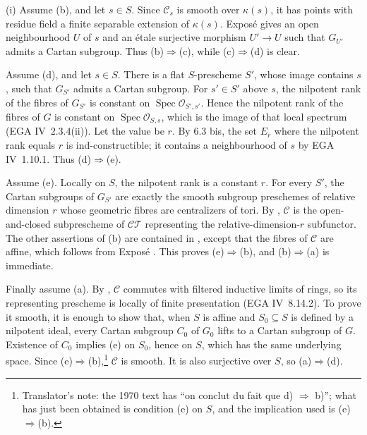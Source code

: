 (i) Assume (b), and let \(s\in S\). Since \(\mathcal C_s\) is smooth
over \(\kappa(s)\), it has points with residue field a finite
separable extension of \(\kappa(s)\). Exposé  gives an open
neighbourhood \(U\) of \(s\) and an étale surjective morphism
\(U'\to U\) such that \(G_{U'}\) admits a Cartan subgroup. Thus
(b)\(\Rightarrow\)(c), while (c)\(\Rightarrow\)(d) is clear.

Assume (d), and let \(s\in S\). There is a flat \(S\)-prescheme
\(S'\), whose image contains \(s\), such that \(G_{S'}\) admits a
Cartan subgroup. For \(s'\in S'\) above \(s\), the nilpotent rank of
the fibres of \(G_{S'}\) is constant on
\(\operatorname{Spec}\mathcal O_{S',s'}\). Hence the nilpotent rank
of the fibres of \(G\) is constant on
\(\operatorname{Spec}\mathcal O_{S,s}\), which is the image of that
local spectrum (EGA IV~2.3.4(ii)). Let the value be \(r\). By 6.3 bis,
the set \(E_r\) where the nilpotent rank equals \(r\) is
ind-constructible; it contains a neighbourhood of \(s\) by
EGA IV~1.10.1. Thus (d)\(\Rightarrow\)(e).

Assume (e). Locally on \(S\), the nilpotent rank is a constant \(r\).
For every \(S'\), the Cartan subgroups of \(G_{S'}\) are exactly the
smooth subgroup preschemes of relative dimension \(r\) whose
geometric fibres are centralizers of tori. By ,
\(\mathcal C\) is the open-and-closed subprescheme of
\(\mathcal{CT}\) representing the relative-dimension-\(r\)
subfunctor. The other assertions of (b) are contained in
, except that the fibres of \(\mathcal C\) are affine,
which follows from Exposé . This proves
(e)\(\Rightarrow\)(b), and (b)\(\Rightarrow\)(a) is immediate.

Finally assume (a). By , \(\mathcal C\) commutes with filtered
inductive limits of rings, so its representing prescheme is locally
of finite presentation (EGA IV~8.14.2). To prove it smooth, it is
enough to show that, when \(S\) is affine and \(S_0\subseteq S\) is
defined by a nilpotent ideal, every Cartan subgroup \(C_0\) of
\(G_0\) lifts to a Cartan subgroup of \(G\). Existence of \(C_0\)
implies (e) on \(S_0\), hence on \(S\), which has the same underlying
space. Since (e)\(\Rightarrow\)(b),\footnote{Translator's note: the 1970 text
has ``on conclut du fait que d) \(\Rightarrow\) b)''; what has just been
obtained is condition (e) on \(S\), and the implication used is
(e)\(\Rightarrow\)(b).} \(\mathcal C\) is smooth.
It is also surjective over \(S\), so (a)\(\Rightarrow\)(d).

